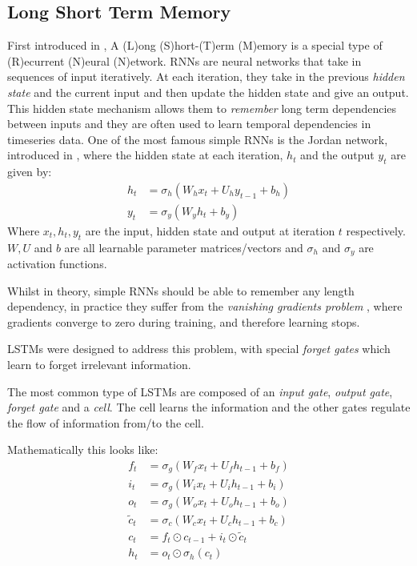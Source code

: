 \documentclass[a4paper, oneside, notitlepage]{book}
\begin{document}
\subsection{Long Short Term Memory}

First introduced in \cite{HOCHREITER1997}, A (L)ong (S)hort-(T)erm (M)emory 
is a special type of (R)ecurrent (N)eural (N)etwork.
RNNs are neural networks that take in sequences of input iteratively. At each iteration,
they take in the previous \textit{hidden state} and the current input and then update
the hidden state and give an output. This hidden state mechanism allows them 
to \textit{remember} long term dependencies between inputs and they are often used to learn temporal dependencies in timeseries data.
One of the most famous simple RNNs is the Jordan network, introduced in \cite{JORDAN1997},
where the hidden state at each iteration, $h_t$ and the output $y_t$ are given by:
\begin{equation}
    \begin{aligned}
        h_t &= \sigma_h(W_h x_t + U_h y_{t-1} + b_h)  \\
        y_t &= \sigma_y(W_y h_t + b_y)
    \end{aligned}
\end{equation}
Where $x_t, h_t, y_t$ are the input, hidden state and output at iteration $t$ respectively.
$W, U$ and $b$ are all learnable parameter matrices/vectors and $\sigma_h$ and $\sigma_y$ are activation functions.

Whilst in theory, simple RNNs should be able to remember any length dependency, in practice
they suffer from the \textit{vanishing gradients problem} \cite{PASCANU2013}, where
gradients converge to zero during training, and therefore learning stops.

LSTMs were designed to address this problem, with special \textit{forget gates} which
learn to forget irrelevant information.

The most common type of LSTMs are composed of an \textit{input gate}, \textit{output gate}, \textit{forget gate}
and a \textit{cell}. The cell learns the information and the other gates regulate the flow of information from/to the cell.

Mathematically this looks like:
\begin{equation}
    \begin{aligned}
        f_t &= \sigma_g(W_f x_t + U_f h_{t-1} + b_f) \\
        i_t &= \sigma_g(W_i x_t + U_i h_{t-1} + b_i) \\
        o_t &= \sigma_g(W_o x_t + U_o h_{t-1} + b_o) \\
        \tilde{c}_t &= \sigma_c(W_c x_t + U_c h_{t-1} + b_c) \\
                c_t &= f_t \odot c_{t-1} + i_t \odot \tilde{c}_t \\
        h_t &= o_t \odot \sigma_h(c_t)
    \end{aligned}
\end{equation}
\end{document}
